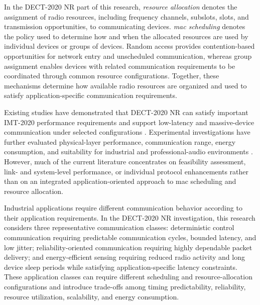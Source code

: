 \documentclass[12pt,a4paper]{article}
\begin{document}
In the DECT-2020 NR part of this research, \textit{resource allocation} denotes
the assignment of radio resources, including frequency channels, subslots,
slots, and transmission opportunities, to communicating devices.
\textit{\gls{mac} scheduling} denotes the policy used to determine how and when
the allocated resources are used by individual devices or groups of devices.
Random access provides contention-based opportunities for network entry and
unscheduled communication, whereas group assignment enables devices with
related communication requirements to be coordinated through common resource
configurations. Together, these mechanisms determine how available radio
resources are organized and used to satisfy application-specific communication
requirements.

Existing studies have demonstrated that DECT-2020 NR can satisfy important
IMT-2020 performance requirements and support low-latency and massive-device
communication under selected configurations
\cite{dhanwaniAssessmentCandidateTechnology2020,
pennerURLLCPerformanceEvaluation2021,
smidaETSIDECT2020Component2023}.
Experimental investigations have further evaluated physical-layer performance,
communication range, energy consumption, and suitability for industrial and
professional-audio environments
\cite{wassmannPerformanceDECT2020NR2024,
haqueDECT2020NRLink2025,
grafWhatExpectWhen2026,
durreDECT2020NRProfessional2024}.
However, much of the current literature concentrates on feasibility assessment,
link- and system-level performance, or individual protocol enhancements rather
than on an integrated application-oriented approach to \gls{mac} scheduling
and resource allocation.

Industrial applications require different communication behavior according to
their application requirements. In the DECT-2020 NR investigation, this
research considers three representative communication classes: deterministic
control communication requiring predictable communication cycles, bounded
latency, and low jitter; reliability-oriented communication requiring highly
dependable packet delivery; and energy-efficient sensing requiring reduced
radio activity and long device sleep periods while satisfying
application-specific latency constraints. These application classes can
require different scheduling and resource-allocation configurations and
introduce trade-offs among timing predictability, reliability, resource
utilization, scalability, and energy consumption.
\end{document}
